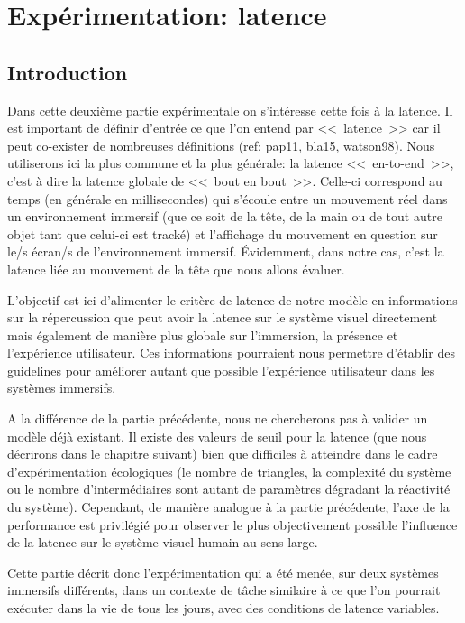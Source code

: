 \part{Expérimentation: latence}

\chapter*{Introduction}
\par Dans cette deuxième partie expérimentale on s'intéresse cette fois à la latence. Il est important de définir d'entrée ce que l'on entend par <<~latence~>> car il peut co-exister de nombreuses définitions (ref: pap11, bla15, watson98). Nous utiliserons ici la plus commune et la plus générale: la latence <<~en-to-end~>>, c'est à dire la latence globale de <<~bout en bout~>>. Celle-ci correspond au temps (en générale en millisecondes) qui s'écoule entre un mouvement réel dans un environnement immersif (que ce soit de la tête, de la main ou de tout autre objet tant que celui-ci est tracké) et l'affichage du mouvement en question sur le/s écran/s de l'environnement immersif. Évidemment, dans notre cas, c'est la latence liée au mouvement de la tête que nous allons évaluer.

\par L'objectif est ici d'alimenter le critère de latence de notre modèle en informations sur la répercussion que peut avoir la latence sur le système visuel directement mais également de manière plus globale sur l'immersion, la présence et l'expérience utilisateur. Ces informations pourraient nous permettre d'établir des guidelines pour améliorer autant que possible l'expérience utilisateur dans les systèmes immersifs.

\par A la différence de la partie précédente, nous ne chercherons pas à valider un modèle déjà existant. Il existe des valeurs de seuil pour la latence (que nous décrirons dans le chapitre suivant) bien que difficiles à atteindre dans le cadre d'expérimentation écologiques (le nombre de triangles, la complexité du système ou le nombre d'intermédiaires sont autant de paramètres dégradant la réactivité du système). Cependant, de manière analogue à la partie précédente, l'axe de la performance est privilégié pour observer le plus objectivement possible l'influence de la latence sur le système visuel humain au sens large.

\par Cette partie décrit donc l'expérimentation qui a été menée, sur deux systèmes immersifs différents, dans un contexte de tâche similaire à ce que l'on pourrait exécuter dans la vie de tous les jours, avec des conditions de latence variables.